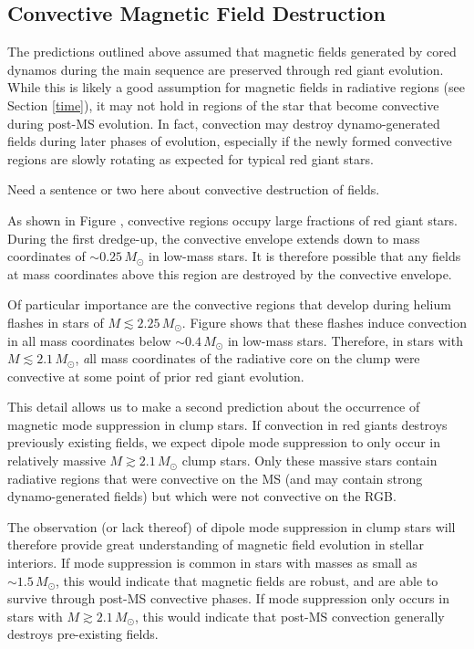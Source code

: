 \subsection{Convective Magnetic Field Destruction}

The predictions outlined above assumed that magnetic fields generated by cored dynamos during the main sequence are preserved through red giant evolution. While this is likely a good assumption for magnetic fields in radiative regions (see Section \ref{time}), it may not hold in regions of the star that become convective during post-MS evolution. In fact, convection may destroy dynamo-generated fields during later phases of evolution, especially if the newly formed convective regions are slowly rotating as expected for typical red giant stars.

Need a sentence or two here about convective destruction of fields. 

As shown in Figure \label{fig:DipoleHistConv}, convective regions occupy large fractions of red giant stars. During the first dredge-up, the convective envelope extends down to mass coordinates of $ \sim 0.25 \! \, M_\odot$ in low-mass stars. It is therefore possible that any fields at mass coordinates above this region are destroyed by the convective envelope.

Of particular importance are the convective regions that develop during helium flashes in stars of $M \lesssim 2.25 \, M_\odot$. Figure \label{fig:DipoleHistConv} shows that these flashes induce convection in all mass coordinates below $ \sim \! 0.4 \, M_\odot$ in low-mass stars. Therefore, in stars with $M \lesssim 2.1 \, M_\odot$, {\emph all} mass coordinates  of the radiative core on the clump were convective at some point of prior red giant evolution. 

This detail allows us to make a second prediction about the occurrence of magnetic mode suppression in clump stars. If convection in red giants destroys previously existing fields, we expect dipole mode suppression to only occur in relatively massive $M \gtrsim 2.1 \, M_\odot$ clump stars. Only these massive stars contain radiative regions that were convective on the MS (and may contain strong dynamo-generated fields) but which were not convective on the RGB. 

The observation (or lack thereof) of dipole mode suppression in clump stars will therefore provide great understanding of magnetic field evolution in stellar interiors. If mode suppression is common in stars with masses as small as $\sim \! 1.5 \, M_\odot$, this would indicate that magnetic fields are robust, and are able to survive through post-MS convective phases. If mode suppression only occurs in stars with $M \gtrsim 2.1 \, M_\odot$, this would indicate that post-MS convection generally destroys pre-existing fields. 
    